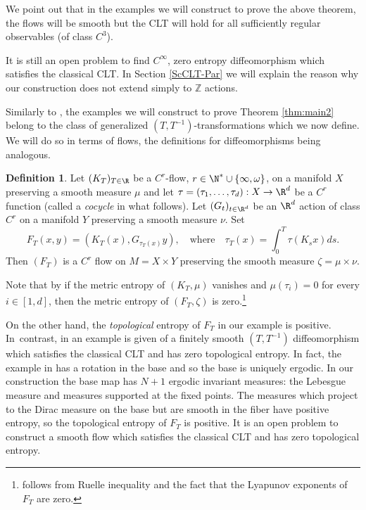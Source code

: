 \documentclass[JEP,XML,SOM,Unicode,NoFloatCountersInSection]{cedram}
\newcommand\Z{\mathbb{Z}}
\theoremstyle{definition}
\newtheorem{definition}{Definition}
\theoremstyle{plain}
\begin{document}
We point out that in the examples we will construct to prove the above theorem, the flows will be smooth
but the CLT will hold for all sufficiently regular observables (of class $C^3$).

It is still an open problem to find $C^\infty$, zero entropy diffeomorphism which satisfies the classical CLT. In Section \ref{ScCLT-Par}
we will explain the reason why our construction does not extend simply to $\Z$ actions.

Similarly to \cite{DDKN}, the examples we will construct to prove Theorem \ref{thm:main2} belong to the class of generalized $(T,T^{-1})$-transformations which we now define. We will do so in terms of flows, the definitions for diffeomorphisms being analogous.

\begin{definition}\label{def:TTinv}
Let $(K_T)_{T\in \R}$ be a $C^r$-flow, $r\in \N^*\cup \{\infty, \omega\}$, on a manifold $X$ preserving a smooth measure $\mu$ and let $\tau=(\tau_1,\ldots,\tau_d):X\to \R^d$ be a
$C^r$ function (called a \emph{cocycle} in what follows). Let $(G_t)_{t\in \R^d}$ be an $\R^d$ action of class $C^r$ on a manifold $Y$ preserving a smooth measure $\nu$. Set
\begin{equation}\label{eq:Tcont}
F_T(x,y)=(K_T(x),G_{\tau_T(x)}y),
\quad\text{where}\quad \tau_T(x)=\int_0^T\tau(K_s x)ds.
\end{equation}
Then $(F_T)$ is a $C^r$ flow on $M=X\times Y$ preserving the smooth measure $\zeta=\mu\times \nu$.
\end{definition}

Note that by \cite[Lem.\,2.1]{DDKN}
if
the metric entropy of $(K_T,\mu)$ vanishes and $\mu(\tau_i)=0$ for every $i\in [1,d]$, then
the metric entropy of $(F_T,\zeta)$ is zero.\footnote{ \cite[Lem.\,2.1]{DDKN} follows
from Ruelle inequality and the fact that the Lyapunov exponents of $F_T$ are zero.}

On the other hand, the \emph{topological} entropy of $F_T$ in our example is positive. In~contrast,
in \cite{DDKN} an example is given of a finitely smooth $(T, T^{-1})$ diffeomorphism which satisfies the classical
CLT and has zero topological entropy. In fact, the example in \cite{DDKN} has a rotation in the base and
so the base is uniquely ergodic. In our construction the base map has $N+1$ ergodic invariant measures:
the Lebesgue measure and measures supported at the fixed points. The measures which project to the Dirac
measure on the base but are smooth in the fiber have positive entropy, so the topological entropy of $F_T$
is positive. It is an open problem to construct a smooth flow which satisfies the classical CLT
and has zero topological entropy.
\end{document}
